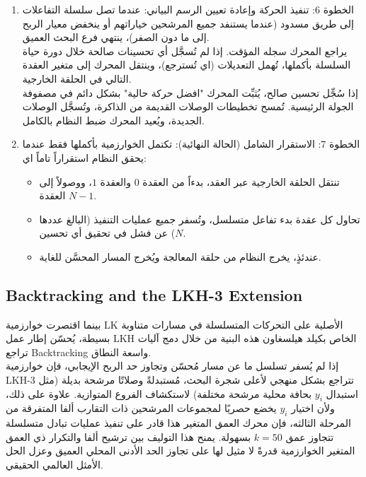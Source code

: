 \documentclass{article}
\newcommand{\en}[1]{\textenglish{#1}}
\begin{document}
\begin{enumerate}
قرار التكرار: تتم زيادة قيمة $k$ (أي $k \leftarrow k+1$)، ثم العودة إلى الخطوة 3 لمحاولة توسيع السلسلة بشكل أعمق بحثاً عن مكاسب أكبر، شريطة استيفاء شروط الخطوه 4 (\en{The Lookahead Tests}).

\item الخطوة 6: تنفيذ الحركة وإعادة تعيين الرسم البياني:
عندما تصل سلسلة التفاعلات إلى طريق مسدود (عندما يستنفد جميع المرشحين خياراتهم أو ينخفض ​​معيار الربح إلى ما دون الصفر)، ينتهي فرع البحث العميق.\\

يراجع المحرك سجله المؤقت. إذا لم تُسجَّل أي تحسينات صالحة خلال دورة حياة السلسلة بأكملها، تُهمل التعديلات (اي تُسترجع)، وينتقل المحرك إلى متغير العقدة التالي في الحلقة الخارجية.\\

إذا سُجِّل تحسين صالح، يُثبِّت المحرك "افضل حركة حالية" بشكل دائم في مصفوفة الجولة الرئيسية. تُمسح تخطيطات الوصلات القديمة من الذاكرة، وتُسجَّل الوصلات الجديدة، ويُعيد المحرك ضبط النظام بالكامل.

\item الخطوة 7: الاستقرار الشامل (الحالة النهائية):
تكتمل الخوارزمية بأكملها فقط عندما يحقق النظام استقراراً تاماً اي:
\begin{itemize}
\item تنتقل الحلقة الخارجية عبر العقد، بدءاً من العقدة $0$ والعقدة $1$، ووصولاً إلى العقدة $N-1$.
\item تحاول كل عقدة بدء تفاعل متسلسل، وتُسفر جميع عمليات التنفيذ (البالغ عددها $N$) عن فشل في تحقيق أي تحسين.
\item عندئذٍ، يخرج النظام من حلقة المعالجة ويُخرج المسار المحسَّن للغاية.
\end{itemize}

\end{enumerate}

\subsection{\en{Backtracking and the LKH-3 Extension}}
بينما اقتصرت خوارزمية \en{LK} الأصلية على التحركات المتسلسلة في مسارات متناوبة بسيطة، يُحسّن إطار عمل \en{LKH} الخاص بكيلد هيلسغاون هذه البنية من خلال دمج آليات تراجع \en{Backtracking} واسعة النطاق.\\

إذا لم يُسفر تسلسل ما عن مسار مُحسّن وتجاوز حد الربح الإيجابي، فإن خوارزمية \en{LKH-3} تتراجع بشكل منهجي لأعلى شجرة البحث، مُستبدلةً وصلاتًا مرشحة بديلة (مثل استبدال $y_i$ بحافة محلية مرشحة مختلفة) لاستكشاف الفروع المتوازية. علاوة على ذلك، ولأن اختيار $y_i$ يخضع حصريًا لمجموعات المرشحين ذات التقارب ألفا المتفرقة من المرحلة الثالثه، فإن محرك العمق المتغير هذا قادر على تنفيذ عمليات تبادل متسلسلة تتجاوز عمق $k=50$ بسهولة. يمنح هذا التوليف بين ترشيح ألفا والتكرار ذي العمق المتغير الخوارزمية قدرةً لا مثيل لها على تجاوز الحد الأدنى المحلي العميق وعزل الحل الأمثل العالمي الحقيقي.\\
\end{document}
